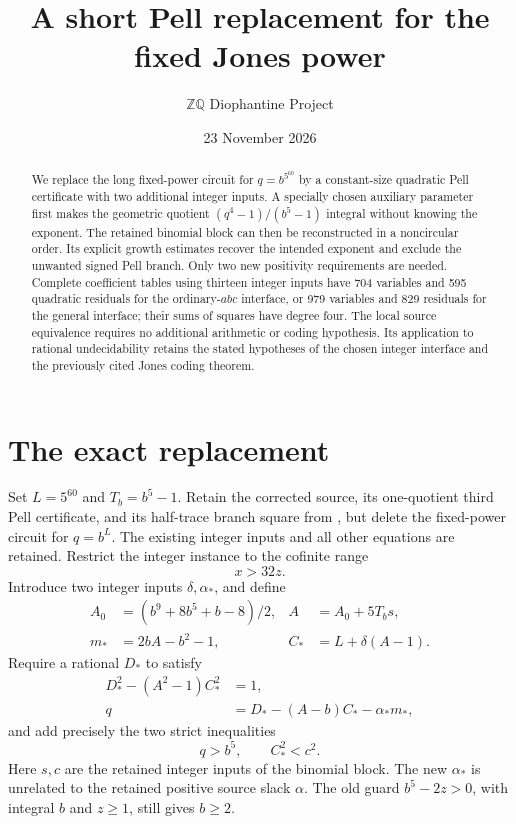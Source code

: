 \documentclass[11pt]{article}
\title{A short Pell replacement for the fixed Jones power}
\author{\(\mathbb Z\mathbb Q\) Diophantine Project}
\date{23 November 2026}
\begin{document}
\maketitle

\begin{abstract}
We replace the long fixed-power circuit for \(q=b^{5^{60}}\) by a
constant-size quadratic Pell certificate with two additional integer
inputs. A specially chosen auxiliary parameter first makes the
geometric quotient \((q^4-1)/(b^5-1)\) integral without knowing the
exponent. The retained binomial block can then be reconstructed in a
noncircular order. Its explicit growth estimates recover the intended
exponent and exclude the unwanted signed Pell branch. Only two new
positivity requirements are needed. Complete coefficient tables using
thirteen integer inputs have 704 variables and 595 quadratic residuals
for the ordinary-\(abc\) interface, or 979 variables and 829 residuals
for the general interface; their sums of squares have degree four.
The local source equivalence
requires no additional arithmetic or coding hypothesis. Its application
to rational undecidability retains the stated hypotheses of the
chosen integer interface and the previously cited Jones coding theorem.
\end{abstract}

\section{The exact replacement}

Set \(L=5^{60}\) and \(T_b=b^5-1\). Retain the corrected source,
its one-quotient third Pell certificate, and its half-trace branch
square from \cite{CRT,Halftrace}, but delete the fixed-power circuit
for \(q=b^L\). The existing integer inputs and all other equations
are retained. Restrict the integer instance to the cofinite range
\[
                              x>32z.
\]
Introduce two integer inputs \(\delta,\alpha_*\), and define
\begin{align}
 A_0&=(b^9+8b^5+b-8)/2,& A&=A_0+5T_bs,\label{A}\\
 m_*&=2bA-b^2-1,& C_*&=L+\delta(A-1).\label{mC}
\end{align}
Require a rational \(D_*\) to satisfy
\begin{align}
 D_*^2-(A^2-1)C_*^2&=1,\label{norm}\\
 q&=D_*-(A-b)C_*-\alpha_*m_*,\label{q}
\end{align}
and add precisely the two strict inequalities
\begin{equation}\label{ineq}
                         q>b^5,\qquad C_*^2<c^2.
\end{equation}
Here \(s,c\) are the retained integer inputs of the binomial block.
The new \(\alpha_*\) is unrelated to the retained positive source
slack \(\alpha\). The old guard \(b^5-2z>0\), with integral
\(b\) and \(z\ge1\), still gives \(b\ge2\).
\end{document}

